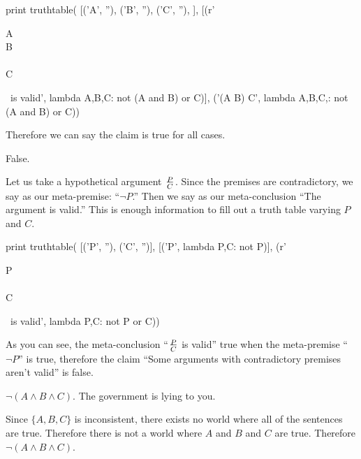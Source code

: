 \begin{python}[truth.py]
print truthtable(
[('A', ''), ('B', ''), ('C', ''), ],
[(r'\begin{smallmatrix}A \\ B \\ \hline \\ C\end{smallmatrix}\ \textrm{is valid}', lambda A,B,C: not (A and B) or C)],
('(A \land B) \lif C', lambda A,B,C,: not (A and B) or C))
\end{python}

Therefore we can say the claim is true for all cases.

\item False.

Let us take a hypothetical argument \(
\begin{smallmatrix}
P \\ \hline \\ C
\end{smallmatrix}
\). Since the premises are contradictory, we say as our meta-premise: ``\( \lnot P \).'' Then we say as our meta-conclusion ``The argument is valid.'' This is enough information to fill out a truth table varying \(P\) and \(C\).

\begin{python}[truth.py]
print truthtable(
[('P', ''), ('C', '')],
[('\lnot P', lambda P,C: not P)],
(r'\begin{smallmatrix}P \\ \hline \\ C\end{smallmatrix}\ \textrm{is valid}', lambda P,C: not P or C))
\end{python}

As you can see, the meta-conclusion ``\(
\begin{smallmatrix}
P \\ \hline \\ C
\end{smallmatrix}
\) is valid'' true when the meta-premise ``\( \lnot P \)'' is true, therefore the claim ``Some arguments with contradictory premises aren't valid'' is false.

\setcounter{enumi}{10}

\item \( \lnot (A \land B \land C) \). The government is lying to you.

Since \( \{A, B, C \} \) is inconsistent, there exists no world where all of the sentences are true. Therefore there is not a world where $A$ and $B$ and $C$ are true. Therefore $\lnot (A \land B \land C)$.

